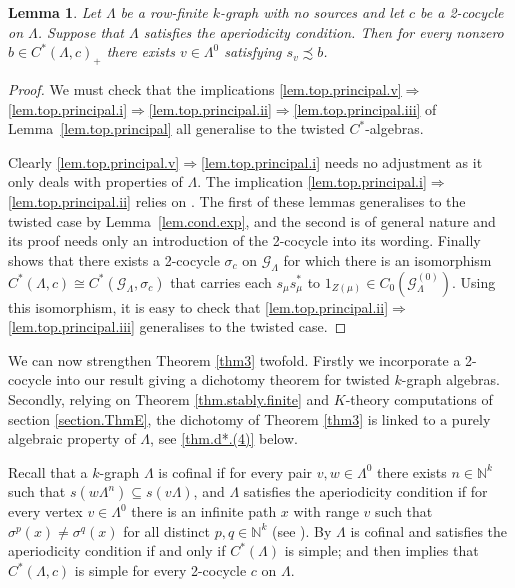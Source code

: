 \documentclass[a4paper, 12pt]{amsart}
\numberwithin{equation}{section}
\newcounter{theorem}
\newtheorem{lemma}[theorem]{Lemma}
\theoremstyle{remark}
\theoremstyle{definition}
\begin{document}
\begin{lemma}\label{lem.top.principal.cycle}
Let $\Lambda$ be a row-finite $k$-graph with no sources and let $c$ be a 2-cocycle on
$\Lambda$. Suppose that $\Lambda$ satisfies the aperiodicity condition. Then for every
nonzero $b\in C^*(\Lambda, c)_+$ there exists $v\in \Lambda^0$ satisfying $s_v\precsim
b$.
\end{lemma}
\begin{proof}
We must check that the implications
\eqref{lem.top.principal.v}$\Rightarrow$\eqref{lem.top.principal.i}$\Rightarrow$\eqref{lem.top.principal.ii}$\Rightarrow$\eqref{lem.top.principal.iii}
of Lemma~\ref{lem.top.principal} all generalise to the twisted $C^*$-algebras.

Clearly \eqref{lem.top.principal.v}$\Rightarrow$\eqref{lem.top.principal.i} needs no
adjustment as it only deals with properties of $\Lambda$.  The implication
\eqref{lem.top.principal.i}$\Rightarrow$\eqref{lem.top.principal.ii} relies on
\cite[Lemmas~3.1 and 3.2]{BroClaSie}. The first of these lemmas generalises to the
twisted case by Lemma~\ref{lem.cond.exp}, and the second is of general nature and its
proof needs only an introduction of the 2-cocycle into its wording. Finally
\cite[Corollary 7.9]{MR3335414} shows that there exists a 2-cocycle $\sigma_c$ on
${\mathcal{G}}_\Lambda$ for which there is an isomorphism $C^*(\Lambda, c)\cong
C^*({\mathcal{G}}_\Lambda,\sigma_c)$ that carries each $s_\mu s_\mu^*$ to $1_{Z(\mu)}\in
C_0({\mathcal{G}}^{(0)}_\Lambda)$. Using this isomorphism, it is easy to check that
\eqref{lem.top.principal.ii}$\Rightarrow$\eqref{lem.top.principal.iii} generalises to the
twisted case.
\end{proof}

We can now strengthen Theorem \ref{thm3} twofold. Firstly we incorporate a 2-cocycle into
our result giving a dichotomy theorem for twisted $k$-graph algebras. Secondly, relying
on Theorem \ref{thm.stably.finite} and $K$-theory computations of section
\ref{section.ThmE}, the dichotomy of Theorem \ref{thm3} is linked to a purely algebraic
property of $\Lambda$, see \eqref{thm.d*.(4)} below.

Recall that a $k$-graph $\Lambda$ is cofinal if for every pair $v,w\in \Lambda^0$ there
exists $n\in {\mathbb{N}}^k$ such that $s(w\Lambda^n)\subseteq s(v\Lambda)$, and $\Lambda$
satisfies the aperiodicity condition if for every vertex $v \in \Lambda^0$ there is an
infinite path $x$ with range $v$ such that $\sigma^p(x)\neq \sigma^q(x)$ for all distinct
$p,q\in {\mathbb{N}}^k$ (see \cite{MR1745529}). By \cite[Theorem 3.1]{MR2323468} $\Lambda$ is
cofinal and satisfies the aperiodicity condition if and only if $C^*(\Lambda)$ is simple; and then
\cite[Corollary 8.2]{MR3335414} implies that $C^*(\Lambda, c)$ is simple for every 2-cocycle
$c$ on $\Lambda$.
\end{document}
